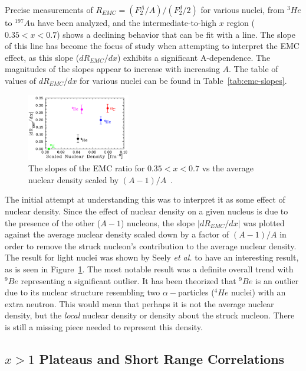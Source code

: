 Precise measurements of $R_{EMC}=(F_2^A/A)/(F_2^d/2)$ for various nuclei, from $^3He$ to $^{197}Au$ have been analyzed, and the intermediate-to-high $x$ region ($0.35<x<0.7$) shows a declining behavior that can be fit with a line. The slope of this line has become the focus of study when attempting to interpret the EMC effect, as this slope ($dR_{EMC}/dx$) exhibits a significant A-dependence. The magnitudes of the slopes appear to increase with increasing $A$. The table of values of $dR_{EMC}/dx$ for various nuclei can be found in Table~\ref{tab:emc-slopes}.

\begin{figure}
	\centering
	\includegraphics[width=0.4\textwidth]{figures/background/emc-vs-density.png}
	\caption{The slopes of the EMC ratio for $0.35<x<0.7$ vs the average nuclear density scaled by $(A-1)/A$~\cite{Seely:2009gt}.}
	\label{fig:emc-slope-vs-density}
\end{figure}
The initial attempt at understanding this was to interpret it as some effect of nuclear density. Since the effect of nuclear density on a given nucleus is due to the presence of the other ($A-1$) nucleons, the slope $|dR_{EMC}/dx|$ was plotted against the average nuclear density scaled down by a factor of $(A-1)/A$ in order to remove the struck nucleon’s contribution to the average nuclear density. The result for light nuclei was shown by Seely \emph{et al.} to have an interesting result, as is seen in Figure~\ref{fig:emc-slope-vs-density}. The most notable result was a definite overall trend with $^9Be$ representing a significant outlier. It has been theorized that $^9Be$ is an outlier due to its nuclear structure resembling two $\alpha-$particles ($^4He$ nuclei) with an extra neutron. This would mean that perhaps it is not the average nuclear density, but the \emph{local} nuclear density or density about the struck nucleon. There is still a missing piece needed to represent this density.



\subsection{$x>1$ Plateaus and Short Range Correlations}

